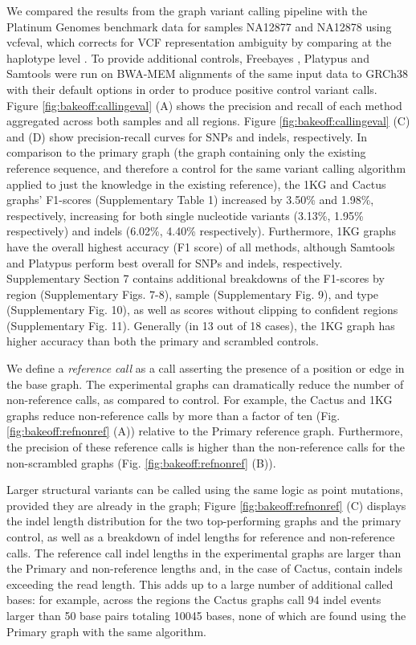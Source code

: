 We compared the results from the graph variant calling pipeline with the
Platinum Genomes benchmark data for samples NA12877 and
NA12878\cite{Eberle2016-zc} using vcfeval, which corrects for VCF
representation ambiguity by comparing at the haplotype level
\cite{Cleary2015-oy} \cite{Zook2014-tl}. To provide additional controls,
Freebayes \cite{garrison2012haplotype}, Platypus \cite{Rimmer2014-zj} and
Samtools \cite{Li2009-je} were run on BWA-MEM \cite{Li2009-tj}
alignments of the same input data to GRCh38 with their default options
in order to produce positive control variant calls. Figure \ref{fig:bakeoff:callingeval} (A) shows
the precision and recall of each method aggregated across both samples
and all regions. Figure \ref{fig:bakeoff:callingeval} (C) and (D) show precision-recall curves for
SNPs and indels, respectively. In comparison to the primary graph (the
graph containing only the existing reference sequence, and therefore a
control for the same variant calling algorithm applied to just the
knowledge in the existing reference), the 1KG and Cactus graphs'
F1-scores (Supplementary Table 1) increased by 3.50\% and 1.98\%,
respectively, increasing for both single nucleotide variants (3.13\%,
1.95\% respectively) and indels (6.02\%, 4.40\% respectively).
Furthermore, 1KG graphs have the overall highest accuracy (F1 score) of
all methods, although Samtools and Platypus perform best overall for
SNPs and indels, respectively. Supplementary Section 7 contains
additional breakdowns of the F1-scores by region (Supplementary Figs.
7-8), sample (Supplementary Fig. 9), and type (Supplementary Fig. 10),
as well as scores without clipping to confident regions (Supplementary
Fig. 11). Generally (in 13 out of 18 cases), the 1KG graph has higher
accuracy than both the primary and scrambled controls.

We define a \emph{reference} \emph{call} as a call asserting the
presence of a position or edge in the base graph. The experimental
graphs can dramatically reduce the number of non-reference calls, as
compared to control. For example, the Cactus and 1KG graphs reduce
non-reference calls by more than a factor of ten (Fig. \ref{fig:bakeoff:refnonref} (A)) relative
to the Primary reference graph. Furthermore, the precision of these
reference calls is higher than the non-reference calls for the
non-scrambled graphs (Fig. \ref{fig:bakeoff:refnonref} (B)).

Larger structural variants can be called using the same logic as point
mutations, provided they are already in the graph; Figure \ref{fig:bakeoff:refnonref} (C) displays
the indel length distribution for the two top-performing graphs and the
primary control, as well as a breakdown of indel lengths for reference
and non-reference calls. The reference call indel lengths in the
experimental graphs are larger than the Primary and non-reference
lengths and, in the case of Cactus, contain indels exceeding the read
length. This adds up to a large number of additional called bases: for
example, across the regions the Cactus graphs call 94 indel events
larger than 50 base pairs totaling 10045 bases, none of which are found
using the Primary graph with the same algorithm.

